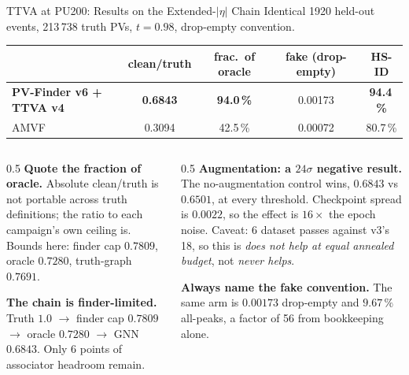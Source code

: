 \documentclass[xcolor=table,aspectratio=169]{beamer}
\begin{document}
\begin{frame}[shrink=15]{TTVA at PU200: Results on the Extended-$|\eta|$ Chain}
    \small
    Identical 1920 held-out events, 213\,738 truth PVs, $t=0.98$, drop-empty convention.
    \vspace{0.4em}

    \begin{center}
    \begin{tabular}{lcccc}
        \hline
        & clean/truth & \textbf{frac.\ of oracle} & fake (drop-empty) & HS-ID \\
        \hline
        \textbf{PV-Finder v6 + TTVA v4} & \textbf{0.6843} & \textbf{94.0\,\%} & 0.00173 & \textbf{94.4\,\%} \\
        AMVF & 0.3094 & 42.5\,\% & 0.00072 & 80.7\,\% \\
        \hline
    \end{tabular}
    \end{center}
    \vspace{0.3em}

    \begin{columns}[t]
        \begin{column}{0.5\linewidth}
            \textbf{Quote the fraction of oracle.} Absolute clean/truth is not
            portable across truth definitions; the ratio to each campaign's own
            ceiling is. Bounds here: finder cap $0.7809$, oracle $0.7280$,
            truth-graph $0.7691$.
            \vspace{0.4em}

            \textbf{The chain is finder-limited.} Truth $1.0$ $\to$ finder cap
            $0.7809$ $\to$ oracle $0.7280$ $\to$ GNN $0.6843$. Only 6 points of
            associator headroom remain.
        \end{column}
        \begin{column}{0.5\linewidth}
            \textbf{Augmentation: a $24\sigma$ negative result.} The
            no-augmentation control wins, $0.6843$ vs $0.6501$, at every threshold.
            Checkpoint spread is $0.0022$, so the effect is $16\times$ the epoch
            noise. Caveat: 6 dataset passes against v3's 18, so this is
            \emph{does not help at equal annealed budget}, not \emph{never helps}.
            \vspace{0.4em}

            \textcolor{pennred}{\textbf{Always name the fake convention.}} The same
            arm is $0.00173$ drop-empty and $9.67\,\%$ all-peaks, a factor of 56
            from bookkeeping alone.
        \end{column}
    \end{columns}
\end{frame}
\end{document}
